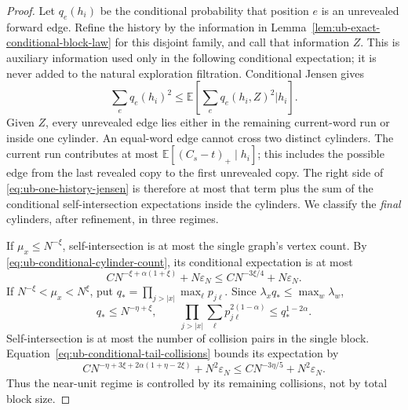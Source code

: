 \documentclass[11pt]{article}
\numberwithin{equation}{section}
\newcommand{\E}{\mathbb E}
\newcommand{\1}{\mathbf 1}
\begin{document}
\begin{proof}
Let \(q_e(h_i)\) be the conditional probability that position
\(e\) is an unrevealed forward edge. Refine the history by the
information in Lemma~\ref{lem:ub-exact-conditional-block-law} for
this disjoint family, and call that information \(Z\). This is auxiliary information
used only in the following conditional expectation; it is never
added to the natural exploration filtration. Conditional
Jensen gives
\begin{equation}
\label{eq:ub-one-history-jensen}
 \sum_e q_e(h_i)^2
 \le\E\left[\sum_e q_e(h_i,Z)^2\mathrel{\Big|}h_i\right].
\end{equation}
Given \(Z\), every unrevealed edge lies either in the remaining
current-word run or inside one cylinder. An equal-word edge cannot
cross two distinct cylinders. The current run contributes at most
\(\E[(C_s-t)_+\mid h_i]\); this includes the possible edge
from the last revealed copy to the first unrevealed copy. The
right side of \eqref{eq:ub-one-history-jensen} is therefore at
most that term plus the sum of the conditional self-intersection
expectations inside the cylinders. We classify the \emph{final}
cylinders, after refinement, in three regimes.

If \(\mu_x\le N^{-\xi}\), self-intersection is at most the
single graph's vertex count. By
\eqref{eq:ub-conditional-cylinder-count}, its conditional expectation
is at most
\[
 C N^{-\xi+\alpha(1+\xi)}+N\varepsilon_N
 \le C N^{-3\xi/4}+N\varepsilon_N.
\]
If \(N^{-\xi}<\mu_x<N^\xi\), put
\(q_* =\prod_{j>|x|}\max_\ell p_{j\ell}\). Since
\(\lambda_xq_*\le\max_w\lambda_w\),
\[
 q_*\le N^{-\eta+\xi},\qquad
 \prod_{j>|x|}\sum_\ell p_{j\ell}^{2(1-\alpha)}
 \le q_*^{1-2\alpha}.
\]
Self-intersection is at most the number of collision pairs in the
single block. Equation~\eqref{eq:ub-conditional-tail-collisions}
bounds its expectation by
\[
 C N^{-\eta+3\xi+2\alpha(1+\eta-2\xi)}+N^2\varepsilon_N
 \le C N^{-3\eta/5}+N^2\varepsilon_N.
\]
Thus the near-unit regime is controlled by its remaining collisions,
not by total block size.


\end{proof}
\end{document}
